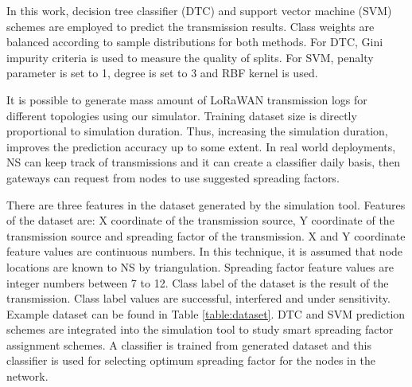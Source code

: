 In this work, decision tree classifier (DTC) and support vector machine (SVM) \cite{Alpaydin} schemes are employed to predict the transmission results. Class weights are balanced according to sample distributions for both methods. For DTC, Gini impurity criteria is used to measure the quality of splits. For SVM, penalty parameter is set to 1, degree is set to 3 and RBF kernel is used.

It is possible to generate mass amount of LoRaWAN transmission logs for different topologies using our simulator. Training dataset size is directly proportional to simulation duration. Thus, increasing the simulation duration, improves the prediction accuracy up to some extent. In real world deployments, NS can keep track of transmissions and it can create a classifier daily basis, then gateways can request from nodes to use suggested spreading factors.

There are three features in the dataset generated by the simulation tool. Features of the dataset are: X coordinate of the transmission source, Y coordinate of the transmission source and spreading factor of the transmission. X and Y coordinate feature values are continuous numbers. In this technique, it is assumed that node locations are known to NS by triangulation. Spreading factor feature values are integer numbers between 7 to 12. Class label of the dataset is the result of the transmission. Class label values are successful, interfered and under sensitivity. Example dataset can be found in Table \ref{table:dataset}. DTC and SVM prediction schemes are integrated into the simulation tool to study smart spreading factor assignment schemes. A classifier is trained from generated dataset and this classifier is used for selecting optimum spreading factor for the nodes in the network.

